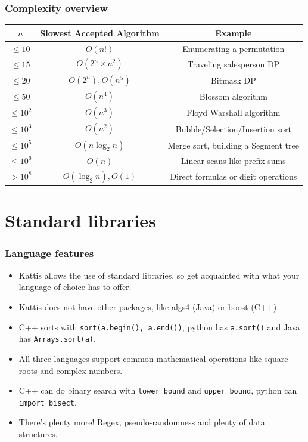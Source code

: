 \documentclass{beamer}
\begin{document}
\begin{frame}[plain]
    \frametitle{Complexity overview}
    \scriptsize
    \begin{center}
        \begin{tabular}{c|c|c}
            $n$ & Slowest Accepted Algorithm & Example \\
            \hline
            $\leq 10$ & $O(n!)$ & Enumerating a permutation \\
            $\leq 15$ & $O(2^n\times n^2)$ & Traveling salesperson DP \\
            $\leq 20$ & $O(2^n), O(n^5)$ & Bitmask DP \\
            $\leq 50$ & $O(n^4)$ & Blossom algorithm \\
            $\leq 10^2$ & $O(n^3)$ & Floyd Warshall algorithm \\
            $\leq 10^3$ & $O(n^2)$ & Bubble/Selection/Insertion sort \\
            $\leq 10^5$ & $O(n\log_2{n})$ & Merge sort, building a Segment tree \\
            $\leq 10^6$ & $O(n)$ & Linear scans like prefix sums \\
            $> 10^8$ & $O(\log_2{n}), O(1)$ & Direct formulas or digit operations \\
        \end{tabular}
    \end{center}
\end{frame}

\section*{Standard libraries}

\begin{frame}[plain]
    \frametitle{Language features}
    \begin{itemize}
        \item Kattis allows the use of standard libraries, so get acquainted with what your language of choice has to offer.
        \item Kattis does not have other packages, like algs4 (Java) or boost (C++)
        \item C++ sorts with \texttt{sort(a.begin(), a.end())}, python has \texttt{a.sort()} and Java has \texttt{Arrays.sort(a)}.
        \item All three languages support common mathematical operations like square roots and complex numbers.
        \item C++ can do binary search with \texttt{lower\_bound} and \texttt{upper\_bound}, python can \texttt{import bisect}.
        \item There's plenty more! Regex, pseudo-randomness and plenty of data structures.
    \end{itemize}
\end{frame}
\end{document}
